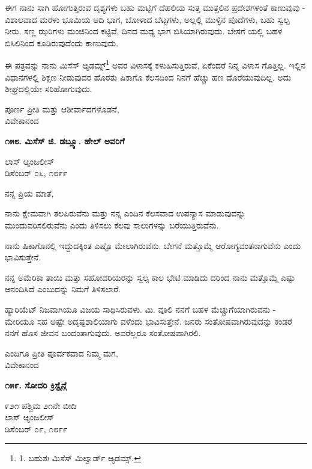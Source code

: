 ಈಗ ನಾನು ಸಾಗಿ ಹೋಗುತ್ತಿರುವ ದೃಶ್ಯಗಳು ಬಹು ಮಟ್ಟಿಗೆ ದೆಹಲಿಯ ಸುತ್ತ ಮುತ್ತಲಿನ ಪ್ರದೇಶಗಳಂತೆ ಕಾಣುವುವು - ವಿಶಾಲವಾದ ಮರಳು ಭೂಮಿಯ ಆದಿ ಭಾಗ, ಬೋಳಾದ ಬೆಟ್ಟಗಳು, ಅಲ್ಲಲ್ಲಿ ಮುಳ್ಳಿನ ಪೊದೆಗಳು, ಬಹು ಸ್ವಲ್ಪ ನೀರು. ಸಣ್ಣ ಝರಿಗಳು ಮಂಜಿನಿಂದ ಕಟ್ಟಿವೆ, ದಿನದ ಮಧ್ಯ ಭಾಗ ಬಿಸಿಯಾಗಿರುವುದು. ಬೇಸಗೆ ಯಲ್ಲಿ ಬಹಳ ಬಿಸಿಲಿನಿಂದ ಕೂಡಿರುವುದೆಂದು ಕಾಣುವುದು.

ಈ ಪತ್ರವನ್ನು ನಾನು ಮಿಸೆಸ್ ಆ್ಯಡಮ್ಸ್\footnote{1. ಬಹುಶಃ ಮಿಸೆಸ್ ಮಿಲ್ವಾರ್ಡ್ ಆ್ಯಡಮ್ಸ್.} ಅವರ ವಿಳಾಸಕ್ಕೆ ಕಳುಹಿಸುತ್ತಿರುವೆ, ಏಕೆಂದರೆ ನಿನ್ನ ವಿಳಾಸ ಗೊತ್ತಿಲ್ಲ. ಇಲ್ಲಿನ ವಿಧಾನಗಳಲ್ಲಿ ಶಿಕ್ಷಣ ನೀಡುವುದರ ಹೊರತು ಷಿಕಾಗೊ ಕೆಲಸದಿಂದ ನಿನಗೆ ಹೆಚ್ಚು ಹಣ ದೊರೆಯುವುದಿಲ್ಲ. ಅದು ಶೀಘ್ರದಲ್ಲಿಯೇ ಸರಿಹೋಗುವುದು.

\begin{flushright}
ಪೂರ್ಣ ಪ್ರೀತಿ ಮತ್ತು ಆಶೀರ್ವಾದಗಳೊಡನೆ,\\ವಿವೇಕಾನಂದ
\end{flushright}

\begin{center}
\textbf{೧೫೮. ಮಿಸೆಸ್ ಜಿ. ಡಬ್ಲ್ಯೂ. ಹೇಲ್ ಅವರಿಗೆ}
\end{center}

\begin{flushright}
ಲಾಸ್ ಆ್ಯಂಜಲೀಸ್\\ಡಿಸೆಂಬರ್ ೦೬, ೧೮೯೯
\end{flushright}

ನನ್ನ ಪ್ರಿಯ ಮಾತೆ,

ನಾನು ಕ್ಷೇಮವಾಗಿ ತಲಪಿರುವೆನು ಮತ್ತು ನನ್ನ ಎಂದಿನ ಕೆಲಸವಾದ ಉಪನ್ಯಾಸ ಮಾಡುವುದನ್ನು ಮುಂದುವರಿಸಲಿರುವೆನು ಎಂದು ತಿಳಿಸಲು ಕೆಲವು ಸಾಲುಗಳನ್ನು ಬರೆಯುತ್ತಿರುವೆನು.

ನಾನು ಷಿಕಾಗೊನಲ್ಲಿ ಇದ್ದುದಕ್ಕಿಂತ ಎಷ್ಟೊ ಮೇಲಾಗಿರುವೆನು. ಬೇಗನೆ ಮತ್ತೊಮ್ಮೆ ಆರೋಗ್ಯವಂತನಾಗುವೆನು ಎಂದು ಭಾವಿಸುತ್ತೇನೆ.

ನನ್ನ ಅಮೆರಿಕಾ ತಾಯಿ ಮತ್ತು ಸಹೋದರಿಯರನ್ನು ಸ್ವಲ್ಪ ಕಾಲ ಭೇಟಿ ಮಾಡಿದು ದರಿಂದ ನಾನು ಮತ್ತೊಮ್ಮೆ ಎಷ್ಟು ಆನಂದಿಸಿದೆ ಎಂಬುದನ್ನು ನಿಮಗೆ ತಿಳಿಸಲಾರೆ.

ಹ್ಯಾರಿಯೆಟ್ ನಿಜವಾಗಿಯೂ ವಿಜಯ ಸಾಧಿಸಿರುವಳು. ಮಿ. ವೂಲಿ ನನಗೆ ಬಹಳ ಮೆಚ್ಚುಗೆಯಾಗಿರುವನು - ಮೇರಿಯೂ ಸಹ ಅಷ್ಟೇ ಅದೃಷ್ಟಶಾಲಿಯಾಗು ವಳೆಂದು ಭಾವಿಸುತ್ತೇನೆ. ಜನರು ಸಂತೋಷವಾಗಿರುವುದನ್ನು ಕಂಡರೆ ನನಗೆ ಹೊಸ ಜೀವನ ಬಂದಂತಾಗುವುದು. ಅವರೆಲ್ಲರೂ ಸಂತೋಷವಾಗಿರಲಿ.

\begin{flushright}
ಎಂದಿಗೂ ಪ್ರೀತಿ ಪೂರ್ವಕವಾದ ನಿಮ್ಮ ಮಗ,\\ವಿವೇಕಾನಂದ
\end{flushright}

\begin{center}
\textbf{೧೫೯. ಸೋದರಿ ಕ್ರಿಸ್ಟೈನ್ಗೆ}
\end{center}

\begin{flushright}
೯೨೧ ಪಶ್ಚಿಮ ೨೧ನೇ ಬೀದಿ\\ಲಾಸ್ ಆ್ಯಂಜಲೀಸ್\\ಡಿಸೆಂಬರ್ ೦೯, ೧೮೯೯
\end{flushright}

